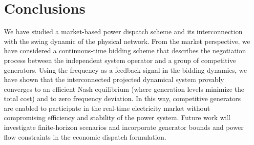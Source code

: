 \documentclass[journal]{IEEEtran}
\newcommand{\1}{\mathds 1}
\theoremstyle{remark}
\theoremstyle{definition}
\begin{document}
\section{Conclusions}\label{sec:conclusions}
 
We have studied a market-based power dispatch scheme and its
interconnection with the swing dynamic of the physical network. From
the market perspective, we have considered a continuous-time bidding
scheme that describes the negotiation process between the independent
system operator and a group of competitive generators.
Using the frequency as a feedback signal in the bidding dynamics, we
have shown that the interconnected projected dynamical system provably
converges to an efficient Nash equilibrium (where generation levels
minimize the total cost) and to zero frequency deviation. In this way,
competitive generators are enabled to participate in the real-time
electricity market without compromising efficiency and stability of
the power system. Future work will investigate finite-horizon
scenarios and incorporate generator bounds and power flow constraints
in the economic dispatch formulation.



\appendix

\end{document}
